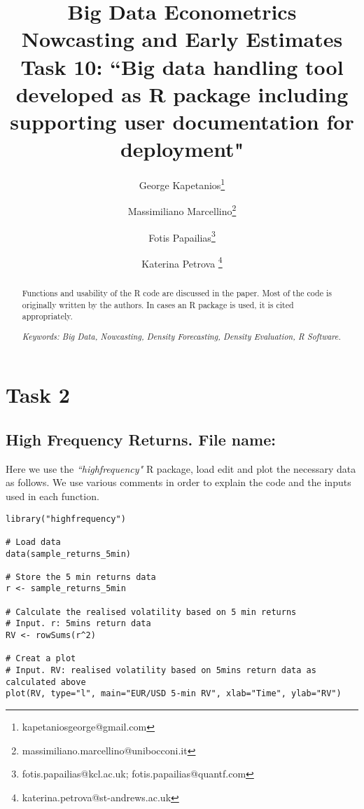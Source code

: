 \documentclass[12pt]{article}
\begin{document}
\title{\textbf{Big Data Econometrics}\\
\textbf{Nowcasting and Early Estimates}\\
\textbf{Task 10: ``Big data handling tool developed as R package including
supporting user documentation for deployment"}}
\author{George Kapetanios\thanks{%
kapetaniosgeorge@gmail.com} \and Massimiliano Marcellino\thanks{%
massimiliano.marcellino@unibocconi.it} \and Fotis Papailias\thanks{%
fotis.papailias@kcl.ac.uk; fotis.papailias@quantf.com} \and Katerina Petrova%
\thanks{%
katerina.petrova@st-andrews.ac.uk} }
\maketitle

\begin{abstract}
Functions and usability of the R code are discussed in the paper. Most of the
code is originally written by the authors. In cases an R package is used, it
is cited appropriately.

\textit{Keywords: Big Data, Nowcasting, Density Forecasting, Density
Evaluation, R Software.}
\end{abstract}

\newpage
\clearpage
\tableofcontents
\newpage

\section{Task 2}

\subsection{High Frequency Returns. File name: \color{blue}{HF.R}}

Here we use the \emph{``highfrequency"} R package, load edit and plot the
necessary data as follows. We use various comments in order to explain the
code and the inputs used in each function.

\begin{lstlisting}[title=\textbf{Realised Volatility based on 5-min cleaned returns.}]
library("highfrequency")

# Load data
data(sample_returns_5min)

# Store the 5 min returns data
r <- sample_returns_5min

# Calculate the realised volatility based on 5 min returns
# Input. r: 5mins return data
RV <- rowSums(r^2)

# Creat a plot
# Input. RV: realised volatility based on 5mins return data as calculated above
plot(RV, type="l", main="EUR/USD 5-min RV", xlab="Time", ylab="RV")
\end{lstlisting}
\end{document}
